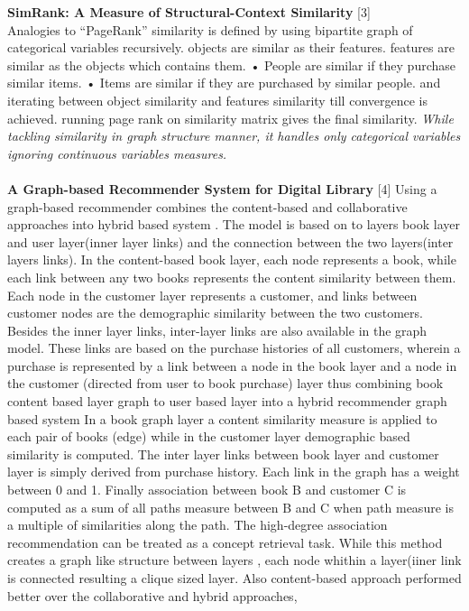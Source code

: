 \documentclass[a4paper]{article}
\begin{document}
\textbf{SimRank: A Measure of Structural-Context Similarity }[3]\\
Analogies to “PageRank”  similarity is defined by using bipartite graph of categorical variables recursively. 
objects are similar as their features.
features are similar as the objects which contains them.
• People are similar if they purchase similar items. 
• Items are similar if they are purchased by similar people. 
and  iterating between object similarity and features similarity
till convergence is achieved.
running page rank on similarity matrix gives the final similarity. \emph{While tackling  similarity in  graph structure manner, it handles only categorical variables ignoring continuous variables measures.}\\
\\
\textbf{A Graph-based Recommender System for Digital Library} [4] Using a graph-based recommender combines the content-based and  collaborative approaches into hybrid  based system .
The model is based on to layers book layer and user layer(inner layer links) and the connection between the two layers(inter layers links).
In the content-based book layer, each node represents a book, while each link between any two books represents the content similarity between them. Each node in the customer layer represents a customer, and links between customer nodes are the demographic similarity between the two customers. Besides the inner layer links, inter-layer links are also available in the graph model. These links are based on the purchase histories of all customers, wherein a purchase is represented by a link between a node in the book layer and a node in the customer (directed from user to book purchase) layer thus combining book content based layer graph to user based layer into a hybrid recommender graph based system In a book graph layer a content similarity measure is applied to each pair of books (edge) while in the customer layer demographic based similarity is computed. 
The inter layer links between book layer and customer layer is simply derived from purchase history. Each link in the graph has a weight between 0 and 1.
Finally association between  book B and customer C
 is computed as a sum of all paths measure between B and C when path measure is a multiple of similarities along the path.
The high-degree association recommendation can be treated as a concept retrieval task. 
While this method creates a graph like structure between layers , each node whithin  a layer(iiner link  is connected resulting a clique sized layer.
Also content-based approach performed better over the collaborative and hybrid approaches,
\end{document}
